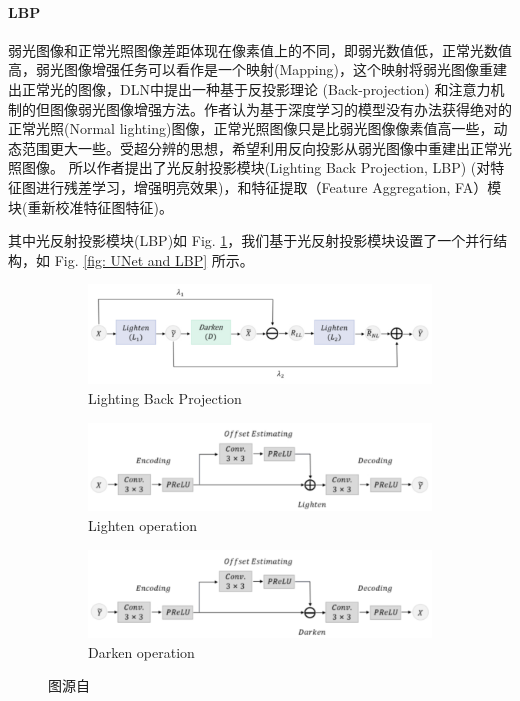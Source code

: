 \documentclass[a4paper]{ctexart}
\begin{document}
		\paragraph{LBP}
		
		弱光图像和正常光照图像差距体现在像素值上的不同，即弱光数值低，正常光数值高，弱光图像增强任务可以看作是一个映射(Mapping)，这个映射将弱光图像重建出正常光的图像，DLN\cite{DLN2020}中提出一种基于反投影理论 (Back-projection) 和注意力机制的但图像弱光图像增强方法。作者认为基于深度学习的模型没有办法获得绝对的正常光照(Normal lighting)图像，正常光照图像只是比弱光图像像素值高一些，动态范围更大一些。受超分辨\cite{haris2018deep}的思想，希望利用反向投影从弱光图像中重建出正常光照图像。 所以作者提出了光反射投影模块(Lighting Back Projection, LBP) (对特征图进行残差学习，增强明亮效果)，和特征提取（Feature Aggregation, FA）模块(重新校准特征图特征)。

		其中光反射投影模块(LBP)如 Fig. \ref{fig: LBP}，我们基于光反射投影模块设置了一个并行结构，如 Fig. \ref{fig: UNet and LBP} 所示。
		
		\begin{figure}[htbp]
			\centering
			\begin{subfigure}{0.8\textwidth}
				\includegraphics[width=\linewidth]{picture/LLIE/Experiment/LBP}
				\captionsetup{font=scriptsize}
				\caption{Lighting Back Projection}
				\label{fig: LBP}
			\end{subfigure}
			\begin{subfigure}{0.8\textwidth}
				\includegraphics[width=\linewidth]{picture/LLIE/Experiment/Lighten operation}
				\captionsetup{font=scriptsize}
				\caption{Lighten operation}
				\label{fig: Lighten operation}	
			\end{subfigure}
			\begin{subfigure}{0.8\textwidth}
				\includegraphics[width=\linewidth]{picture/LLIE/Experiment/Darken operation}
				\captionsetup{font=scriptsize}
				\caption{Darken operation}
				\label{fig: Darken operation}	
			\end{subfigure}
			\caption{图源自\cite{shen2022low}}
		\end{figure}
		
\end{document}
